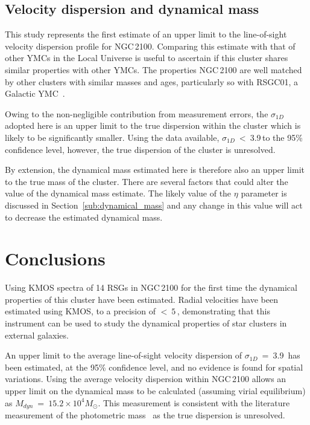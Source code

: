 
\subsection{Velocity dispersion and dynamical mass} %
\label{sub:velocity_dispersion_Mdyn}

This study represents the first estimate of an upper limit to the line-of-sight velocity dispersion profile for NGC\,2100.
Comparing this estimate with that of other YMCs in the Local Universe is useful to ascertain if this cluster shares similar properties with other YMCs.
The properties NGC\,2100 are well matched by other clusters with similar masses and ages, particularly so with RSGC01, a Galactic YMC~\citep{2007ApJ...671..781D}.

Owing to the non-negligible contribution from measurement errors, the $\sigma_{1D}$ adopted here is an upper limit to the true dispersion within the cluster which is likely to be significantly smaller.
Using the data available, $\sigma_{1D}$~<~3.9\,\kms to the 95\% confidence level, however,
the true dispersion of the cluster is unresolved.

By extension, the dynamical mass estimated here is therefore also an upper limit to the true mass of the cluster.
There are several factors that could alter the value of the dynamical mass estimate.
The likely value of the $\eta$ parameter is discussed in Section~\ref{sub:dynamical_mass} and any change in this value will act to decrease the estimated dynamical mass.


\section{Conclusions} %
\label{sec:conclusions}

Using KMOS spectra of 14 RSGs in NGC\,2100 for the first time the dynamical properties of this cluster have been estimated.
Radial velocities have been estimated using KMOS, to a precision of $<~5$\,\kms, demonstrating that this instrument can be used to study the dynamical properties of star clusters in external galaxies.

An upper limit to the average line-of-sight velocity dispersion of $\sigma_{1D}$~=~3.9\,\kms
has been estimated, at the 95\% confidence level, and no evidence is found for spatial variations.
Using the average velocity dispersion within NGC\,2100 allows an upper limit on the dynamical mass to be calculated
(assuming virial equilibrium) as $M_{dyn}$~=~$15.2\times 10^{4}M_{\odot}$.
This measurement is consistent with the literature measurement of the photometric mass~\citep{2005ApJS..161..304M} as the true dispersion is unresolved.

